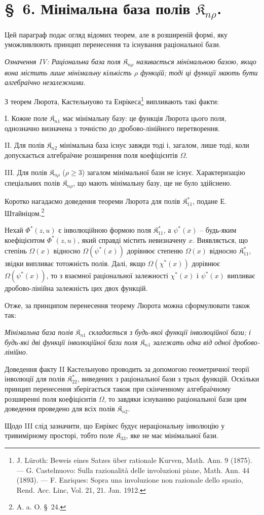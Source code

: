 \documentclass[11pt]{article}
\providecommand{\Kfield}{\mathfrak{K}}
\begin{document}
\section*{\S\ 6. Мінімальна база полів $\Kfield_{n\rho}$.}

Цей параграф подає огляд відомих теорем, але в розширеній формі, яку уможливлюють принцип перенесення та існування раціональної бази.

\emph{Означення IV: Раціональна база поля $\Kfield_{n\rho}$ називається мінімальною базою, якщо вона містить лише мінімальну кількість $\rho$ функцій; тоді ці функції мають бути алгебраїчно незалежними.}

З теорем Люрота, Кастельнуово та Енрікеса\footnote{J. Lüroth: Beweis eines Satzes über rationale Kurven, Math. Ann. 9 (1875). --- G. Castelnuovo: Sulla razionalità delle involuzioni piane, Math. Ann. 44 (1893). --- F. Enriques: Sopra una involuzione non razionale dello spazio, Rend. Acc. Linc, Vol. 21, 21. Jan. 1912.} випливають такі факти:

I. Кожне поле $\Kfield_{n1}$ має мінімальну базу: це функція Люрота цього поля, однозначно визначена з точністю до дробово-лінійного перетворення.

II. Для полів $\Kfield_{n2}$ мінімальна база існує завжди тоді і, загалом, лише тоді, коли допускається алгебраїчне розширення поля коефіцієнтів $\Omega$.

III. Для полів $\Kfield_{n\rho}$ ($\rho\ge3$) загалом мінімальної бази не існує. Характеризацію спеціальних полів $\Kfield_{n\rho}$, що мають мінімальну базу, ще не було здійснено.

Коротко нагадаємо доведення теореми Люрота для полів $\Kfield^*_{11}$, подане Е. Штайніцом.\footnote{A. a. O. \S\ 24.}

Нехай $\Phi^*(z,u)$ є інволюційною формою поля $\Kfield^*_{11}$, а $\psi^*(x)$ -- будь-яким коефіцієнтом $\Phi^*(z,u)$, який справді містить невизначену $x$. Виявляється, що степінь $\Omega(x)$ відносно $\Omega(\psi^*(x))$ дорівнює степеню $\Omega(x)$ відносно $\Kfield^*_{11}$, звідки випливає тотожність полів. Далі, якщо $\Omega(\chi^*(x))$ дорівнює $\Omega(\psi^*(x))$, то з взаємної раціональної залежності $\chi^*(x)$ і $\psi^*(x)$ випливає дробово-лінійна залежність цих двох функцій.

Отже, за принципом перенесення теорему Люрота можна сформулювати також так:

\emph{Мінімальна база полів $\Kfield_{n1}$ складається з будь-якої функції інволюційної бази; і будь-які дві функції інволюційної бази поля $\Kfield_{n1}$ залежать одна від одної дробово-лінійно.}

Доведення факту II Кастельнуово проводить за допомогою геометричної теорії інволюції для полів $\Kfield^*_{22}$, виведених з раціональної бази з трьох функцій. Оскільки принцип перенесення зберігається також при скінченному алгебраїчному розширенні поля коефіцієнтів $\Omega$, то завдяки існуванню раціональної бази цим доведення проведено для всіх полів $\Kfield_{n2}$.

Щодо III слід зазначити, що Енрікес будує нераціональну інволюцію у тривимірному просторі, тобто поле $\Kfield_{33}$, яке не має мінімальної бази.
\end{document}
